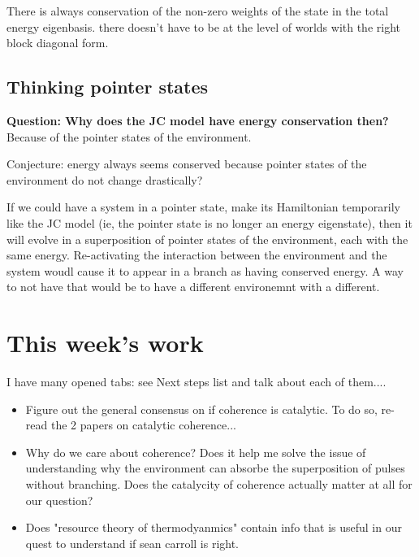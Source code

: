 \documentclass{article}
\begin{document}
There is always conservation of the non-zero weights of the state in the total energy eigenbasis. there doesn't have to be at the level of worlds with the right block diagonal form. 


\subsection{Thinking pointer states}

\textbf{Question: Why does the JC model have energy conservation then?}
Because of the pointer states of the environment. 

Conjecture: energy always seems conserved because pointer states of the environment do not change drastically? 

If we could have a system in a pointer state, make its Hamiltonian temporarily like the JC model (ie, the pointer state is no longer an energy eigenstate), then it will evolve in a superposition of pointer states of the environment, each with the same energy. Re-activating the interaction between the environment and the system woudl cause it to appear in a branch as having conserved energy. A way to not have that would be to have a different environemnt with a different.



\section*{This week's work}

I have many opened tabs: see Next steps list and talk about each of them....

\begin{itemize}
    \item Figure out the general consensus on if coherence is catalytic. To do so, re-read the 2 papers on catalytic coherence...
    \item Why do we care about coherence? Does it help me solve the issue of understanding why the environment can absorbe the superposition of pulses without branching. Does the catalycity of coherence actually matter at all for our question?
    \item Does "resource theory of thermodyanmics" contain info that is useful in our quest to understand if sean carroll is right.
\end{itemize}
\end{document}
